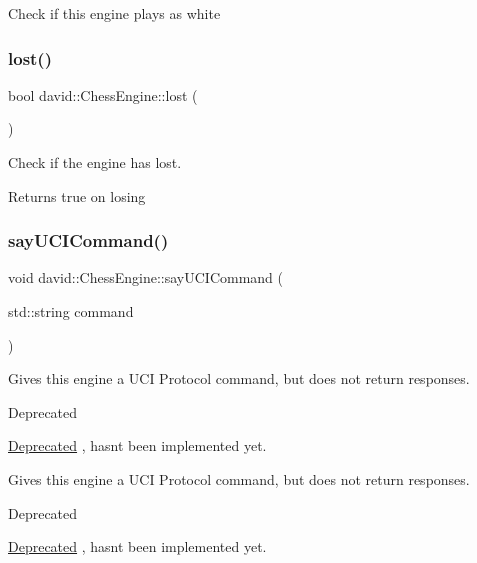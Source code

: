 Check if this engine plays as white \mbox{\label{classdavid_1_1ChessEngine_a498710f8adfacee9b066d69e5c9399c5}} 
\subsubsection{\texorpdfstring{lost()}{lost()}}
{\footnotesize\ttfamily bool david\+::\+Chess\+Engine\+::lost (\begin{DoxyParamCaption}{ }\end{DoxyParamCaption})}

Check if the engine has lost.

\begin{DoxyReturn}{Returns}
true on losing 
\end{DoxyReturn}
\mbox{\label{classdavid_1_1ChessEngine_acd362bad7fd99d2210ea2ee9fa92db1a}} 
\subsubsection{\texorpdfstring{say\+U\+C\+I\+Command()}{sayUCICommand()}}
{\footnotesize\ttfamily void david\+::\+Chess\+Engine\+::say\+U\+C\+I\+Command (\begin{DoxyParamCaption}\item[{std\+::string}]{command }\end{DoxyParamCaption})}

Gives this engine a U\+CI Protocol command, but does not return responses. \begin{DoxyRefDesc}{Deprecated}
\item[\hyperlink{deprecated__deprecated000002}{Deprecated}], hasn\textquotesingle{}t been implemented yet. \end{DoxyRefDesc}


Gives this engine a U\+CI Protocol command, but does not return responses.

\begin{DoxyRefDesc}{Deprecated}
\item[\hyperlink{deprecated__deprecated000001}{Deprecated}], hasn\textquotesingle{}t been implemented yet. \end{DoxyRefDesc}
\mbox{\label{classdavid_1_1ChessEngine_a9ae5dd5a237f7ed341a320944285d1f7}} 
